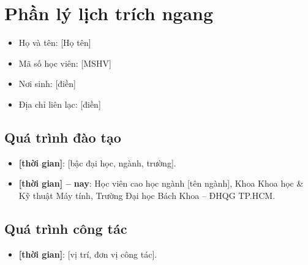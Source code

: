 \chapter*{Phần lý lịch trích ngang}
\pagestyle{fancy}

\vspace{0.5cm}
\begin{itemize}
    \item[] Họ và tên: [Họ tên]
    \vspace{0.2cm}
    \item[] Mã số học viên: [MSHV]
    \vspace{0.2cm}
    \item[]  Nơi sinh: [điền]
    \vspace{0.2cm}
    \item[] Địa chỉ liên lạc: [điền]
\end{itemize}

\section*{Quá trình đào tạo}
\begin{itemize}
    \item \textbf{[thời gian]}: [bậc đại học, ngành, trường].

    \item \textbf{[thời gian] -- nay}: Học viên cao học ngành [tên ngành], Khoa Khoa học \& Kỹ thuật Máy tính, Trường Đại học Bách Khoa -- ĐHQG TP.HCM.
\end{itemize}

\section*{Quá trình công tác}
\begin{itemize}
    \item \textbf{[thời gian]}: [vị trí, đơn vị công tác].
\end{itemize}
